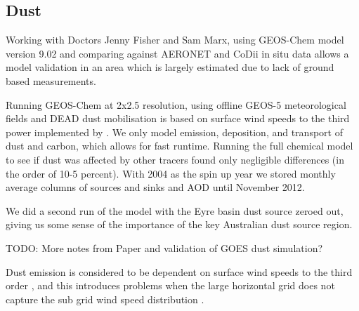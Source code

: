 \subsection{Dust}
Working with Doctors Jenny Fisher and Sam Marx, using GEOS-Chem model version 9.02 and comparing against AERONET and CoDii in situ data allows a model validation in an area which is largely estimated due to lack of ground based measurements.

Running GEOS-Chem at 2x2.5 resolution, using offline GEOS-5 meteorological fields and DEAD dust mobilisation is based on surface wind speeds to the third power implemented by \citet{Duncan_Fairlie_2007}. We only model emission, deposition, and transport of dust and carbon, which allows for fast runtime. Running the full chemical model to see if dust was affected by other tracers found only negligible differences (in the order of 10-5 percent). With 2004 as the spin up year we stored monthly average columns of sources and sinks and AOD until November 2012.

We did a second run of the model with the Eyre basin dust source zeroed out, giving us some sense of the importance of the key Australian dust source region.

TODO: More notes from Paper and validation of GOES dust simulation?
  
Dust emission is considered to be dependent on surface wind speeds to the third order \cite{Duncan_Fairlie_2007}, and this introduces problems when the large horizontal grid does not capture the sub grid wind speed distribution \cite{Ridley_2013}.